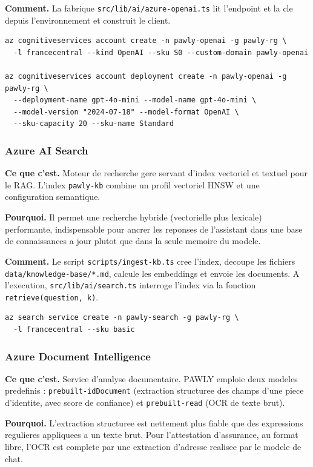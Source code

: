 \documentclass[11pt,a4paper]{article}
\begin{document}
\textbf{Comment.} La fabrique \texttt{src/lib/ai/azure-openai.ts} lit l'endpoint
et la cle depuis l'environnement et construit le client.

\begin{Verbatim}
az cognitiveservices account create -n pawly-openai -g pawly-rg \
  -l francecentral --kind OpenAI --sku S0 --custom-domain pawly-openai

az cognitiveservices account deployment create -n pawly-openai -g pawly-rg \
  --deployment-name gpt-4o-mini --model-name gpt-4o-mini \
  --model-version "2024-07-18" --model-format OpenAI \
  --sku-capacity 20 --sku-name Standard
\end{Verbatim}

\subsubsection{Azure AI Search}
\textbf{Ce que c'est.} Moteur de recherche gere servant d'index vectoriel et
textuel pour le RAG. L'index \texttt{pawly-kb} combine un profil vectoriel HNSW
et une configuration semantique.

\textbf{Pourquoi.} Il permet une recherche hybride (vectorielle plus lexicale)
performante, indispensable pour ancrer les reponses de l'assistant dans une base
de connaissances a jour plutot que dans la seule memoire du modele.

\textbf{Comment.} Le script \texttt{scripts/ingest-kb.ts} cree l'index, decoupe
les fichiers \texttt{data/knowledge-base/*.md}, calcule les embeddings et envoie
les documents. A l'execution, \texttt{src/lib/ai/search.ts} interroge l'index via
la fonction \texttt{retrieve(question, k)}.

\begin{Verbatim}
az search service create -n pawly-search -g pawly-rg \
  -l francecentral --sku basic
\end{Verbatim}

\subsubsection{Azure Document Intelligence}
\textbf{Ce que c'est.} Service d'analyse documentaire. PAWLY emploie deux modeles
predefinis : \texttt{prebuilt-idDocument} (extraction structuree des champs d'une
piece d'identite, avec score de confiance) et \texttt{prebuilt-read} (OCR de
texte brut).

\textbf{Pourquoi.} L'extraction structuree est nettement plus fiable que des
expressions regulieres appliquees a un texte brut. Pour l'attestation
d'assurance, au format libre, l'OCR est complete par une extraction d'adresse
realisee par le modele de chat.
\end{document}

